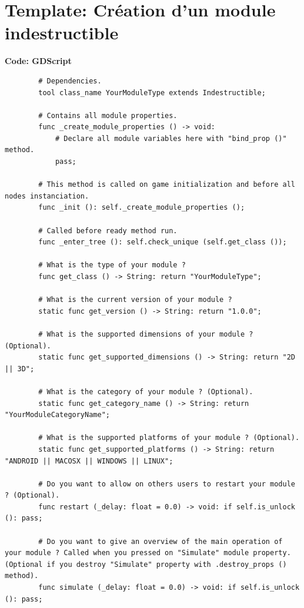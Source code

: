 \documentclass[a4paper, 11pt]{article}
\begin{document}
	\newpage \section{Template: Création d'un module indestructible}
	\textbf{Code: GDScript}
	\begin{lstlisting}
		# Dependencies.
		tool class_name YourModuleType extends Indestructible;

		# Contains all module properties.
		func _create_module_properties () -> void:
			# Declare all module variables here with "bind_prop ()" method.
			pass;

		# This method is called on game initialization and before all nodes instanciation.
		func _init (): self._create_module_properties ();

		# Called before ready method run.
		func _enter_tree (): self.check_unique (self.get_class ());

		# What is the type of your module ?
		func get_class () -> String: return "YourModuleType";

		# What is the current version of your module ?
		static func get_version () -> String: return "1.0.0";

		# What is the supported dimensions of your module ? (Optional).
		static func get_supported_dimensions () -> String: return "2D || 3D";

		# What is the category of your module ? (Optional).
		static func get_category_name () -> String: return "YourModuleCategoryName";
		
		# What is the supported platforms of your module ? (Optional).
		static func get_supported_platforms () -> String: return "ANDROID || MACOSX || WINDOWS || LINUX";

		# Do you want to allow on others users to restart your module ? (Optional).
		func restart (_delay: float = 0.0) -> void: if self.is_unlock (): pass;

		# Do you want to give an overview of the main operation of your module ? Called when you pressed on "Simulate" module property. (Optional if you destroy "Simulate" property with .destroy_props () method).
		func simulate (_delay: float = 0.0) -> void: if self.is_unlock (): pass;
	\end{lstlisting}
\end{document}
